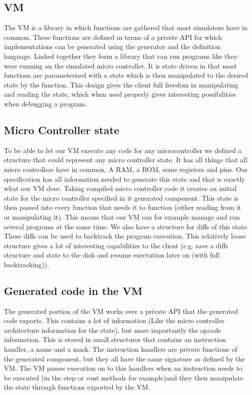 \documentclass[a4paper]{article}
\begin{document}
\subsection{VM}

\bigskip

{\sffamily
The VM is a library in which functions are gathered that most simulators
have in common. These functions are defined in terms of a private API
for which implementations can be generated using the generator and the
definition language. Linked together they form a library that can run
programs like they were running on the simulated micro controller. It
is state driven in that most functions are parameterised with a state
which is then manipulated to the desired state by the function. This
design gives the client full freedom in manipulating and reading the
state, which when used properly gives interesting possibilities when
debugging a program.}


\bigskip

\subsection{Micro Controller state}

\bigskip

{\sffamily
To be able to let our VM execute any code for any microcontroller we
defined a structure that could represent any micro controller state. It
has all things that all micro controllers have in common. A RAM, a ROM,
some registers and pins. Our specification has all information needed
to generate this state and that is exactly what our VM does. Taking
compiled micro controller code it creates an initial state for the
micro controller specified in it generated component. This state is
then passed into every function that needs it to function (either
reading from it or manipulating it). This means that our VM can for
example manage and run several programs at the same time. We also have
a structure for diffs of this state. These diffs can be used to
backtrack the program execution. This relatively loose structure gives
a lot of interesting capabilities to the client (e.g. save a diffs
structure and state to the disk and resume exectution later on (with
full backtracking)).}


\bigskip

\subsection{Generated code in the VM}
{\sffamily
The generated portion of the VM works over a private API that the
generated code exports. This contains a lot of information (Like the
micro controller architecture information for the state), but more
importantly the opcode information. This is stored in small structures
that contains an instruction handler, a name and a mask. The
instruction handlers are private functions of the generated component,
but they all have the same signature as defined by the VM. The VM
passes execution on to this handlers when an instruction needs to be
executed (in the step or cont methods for example)and they then
manipulate the state through functions exported by the VM.}
\end{document}
